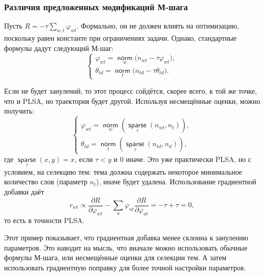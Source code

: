 \documentclass[12pt]{article}
\renewcommand{\phi}{\varphi}
\newcommand{\norm}{\mathop{\mathsf{norm}}\limits}
\newcommand{\sparse}{\mathop{\mathsf{sparse}}\limits}
\begin{document}
 \subsubsection{Различия предложенных модификаций М-шага}
Пусть $R = -\tau \sum\limits_{w, t} \phi_{wt}$. Формально, он не должен влиять на оптимизацию, поскольку  равен константе при ограничениях задачи. Однако, стандартные формулы дадут следующий М-шаг:
\[
\left\{
	\begin{aligned}
		\phi_{wt} = \norm_w \bigl( n_{wt} - \tau \phi_{wt}\bigr),\\
		\theta_{td} = \norm_t \bigl( n_{td} - \tau \theta_{td}\bigr).
	\end{aligned}
\right.
\]

Если не будет занулений, то этот процесс сойдётся, скорее всего,  к той же точке, что и PLSA, но траектория будет другой. Используя несмещённые оценки, можно получить:
\[
\left\{
	\begin{aligned}
		\phi_{wt} = \norm_w (\sparse_{\tau}(n_{wt}, n_{t})),\\
		\theta_{td} = \norm_t (\sparse_{\tau}(n_{td}, n_{d})),
	\end{aligned}
\right.
\]
где $\sparse_{\tau}(x, y) = x$, если $\tau < y$ и $0$ иначе. Это уже практически PLSA, но с условием, на селекцию тем: тема должна содержать некоторое минимальное количество слов (параметр $n_t$), иначе будет удалена.
Использование градиентной добавки даёт 
\[
r_{wt} \propto \frac{\partial{R}}{\partial{\phi_{wt}}} - \sum\limits_u \phi_{ut} \frac{\partial{R}}{\partial{\phi_{ut}}} = -\tau + \tau =0,
\]
то есть в точности PLSA.

Этот пример показывает, что градиентная добавка менее склонна к занулению параметров. Это наводит на мысль, что вначале можно использовать обычные формулы М-шага, или несмещённые оценки для селекции тем. А затем использовать градиентную поправку для более точной настройки параметров.
\end{document}
